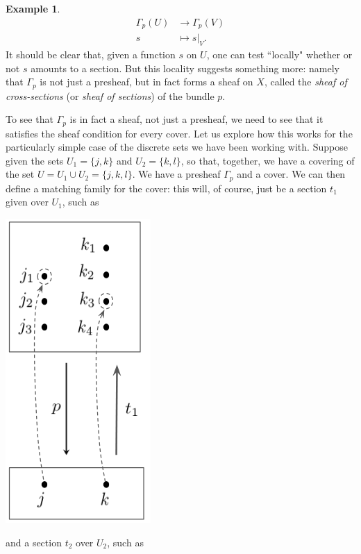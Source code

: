 \documentclass[a4paper]{book}
\theoremstyle{definition}
\newtheorem{example}{Example}[section]
\theoremstyle{definition}
\theoremstyle{definition}
\theoremstyle{theorem}
\theoremstyle{definition}
\begin{document}
\begin{example}
	\begin{align*}
	\Gamma_p(U) & \rightarrow \Gamma_p(V) \\
	s & \mapsto s|_V .  
	\end{align*}
	It should be clear that, given a function $s$ on $U$, one can test ``locally" whether or not $s$ amounts to a section. But this locality suggests something more: namely that $\Gamma_p$ is not just a presheaf, but in fact forms a sheaf on $X$, called the \textit{sheaf of cross-sections} (or \textit{sheaf of sections}) of the bundle $p$. \par 
	To see that $\Gamma_p$ is in fact a sheaf, not just a presheaf, we need to see that it satisfies the sheaf condition for every cover. Let us explore how this works for the particularly simple case of the discrete sets we have been working with. Suppose given the sets $U_1 = \{j,k\}$ and $U_2 = \{k,l\}$, so that, together, we have a covering of the set $U = U_1 \cup U_2 = \{j,k,l\}$. We have a presheaf $\Gamma_p$ and a cover. We can then define a matching family for the cover: this will, of course, just be a section $t_1$ given over $U_1$, such as 
	\begin{center}
		\includegraphics*[scale=0.3]{ShortSec1.png}
	\end{center}
	and a section $t_2$ over $U_2$, such as 
	\begin{center}

\end{center}
\end{example}
\end{document}
